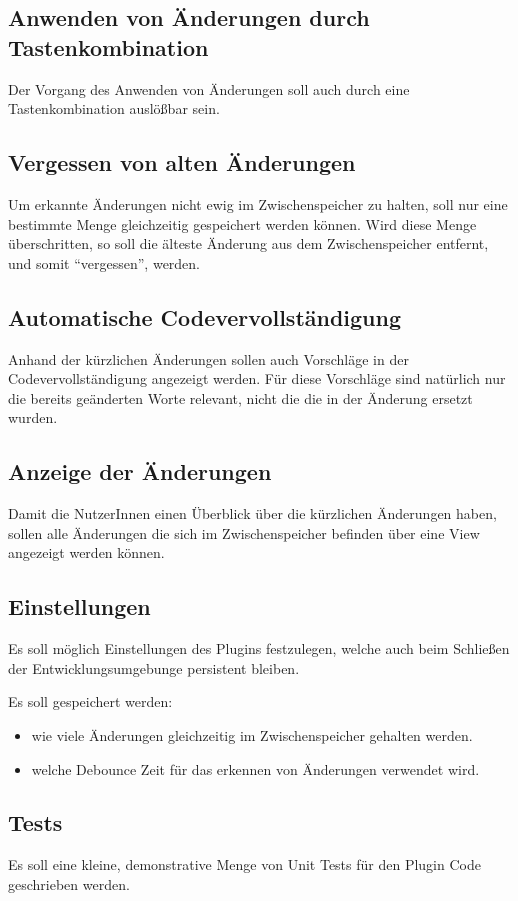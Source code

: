 \subsection{Anwenden von Änderungen durch Tastenkombination}

Der Vorgang des Anwenden von Änderungen soll auch durch eine
Tastenkombination auslößbar sein.

\subsection{Vergessen von alten Änderungen}

Um erkannte Änderungen nicht ewig im Zwischenspeicher zu halten,
soll nur eine bestimmte Menge gleichzeitig gespeichert werden 
können. Wird diese Menge überschritten, so soll die älteste Änderung
aus dem Zwischenspeicher entfernt, und somit \enquote{vergessen}, werden.

\subsection{Automatische Codevervollständigung}

Anhand der kürzlichen Änderungen sollen auch Vorschläge
in der Codevervollständigung angezeigt werden. Für diese
Vorschläge sind natürlich nur die bereits geänderten Worte
relevant, nicht die die in der Änderung ersetzt wurden.

\subsection{Anzeige der Änderungen}

Damit die NutzerInnen einen Überblick über die kürzlichen Änderungen
haben, sollen alle Änderungen die sich im Zwischenspeicher befinden
über eine View angezeigt werden können.

\subsection{Einstellungen}

Es soll möglich Einstellungen des Plugins festzulegen, welche
auch beim Schließen der Entwicklungsumgebunge persistent bleiben.

Es soll gespeichert werden:
\begin{itemize}
    \item wie viele Änderungen gleichzeitig im 
        Zwischenspeicher gehalten werden.
    \item welche Debounce Zeit für das erkennen 
        von Änderungen verwendet wird. 
\end{itemize}

\subsection{Tests}

Es soll eine kleine, demonstrative Menge von Unit Tests für
den Plugin Code geschrieben werden.
